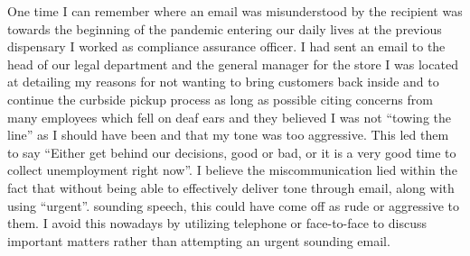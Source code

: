 \documentclass[stu,12pt]{apa7}
\begin{document}
      One time I can remember where an email was misunderstood by the recipient
        was towards the beginning of the pandemic entering our daily lives at
        the previous dispensary I worked as compliance assurance officer. I had
        sent an email to the head of our legal department and the general
        manager for the store I was located at detailing my reasons for not
        wanting to bring customers back inside and to continue the curbside
        pickup process as long as possible citing concerns from many employees
        which fell on deaf ears and they believed I was not ``towing the line''
        as I should have been and that my tone was too aggressive. This led them
        to say ``Either get behind our decisions, good or bad, or it is a very
        good time to collect unemployment right now''. I believe the
        miscommunication lied within the fact that without being able to
        effectively deliver tone through email, along with using ``urgent''.
        sounding speech, this could have come off as rude or aggressive to them.
        I avoid this nowadays by utilizing telephone or face-to-face to discuss
        important matters rather than attempting an urgent sounding email.


    
    
\end{document}
